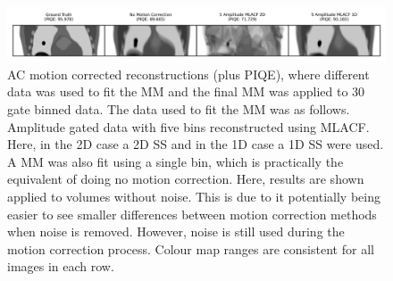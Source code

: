             \begin{figure}
                \centering
                
                \includegraphics[width=1.0\linewidth]{figures/motion_correction_2_results_2_noiseless_1d_vs_2d_visual_analysis.png}
                
                \captionsetup{singlelinecheck=false}
                \caption{
                    \gls{AC} motion corrected reconstructions (plus \gls{PIQE}), where different data was used to fit the \gls{MM} and the final \gls{MM} was applied to $30$ gate binned data. The data used to fit the \gls{MM} was as follows. Amplitude gated data with five bins reconstructed using \gls{MLACF}. Here, in the \gls{2D} case a \gls{2D} \gls{SS} and in the \gls{1D} case a \gls{1D} \gls{SS} were used. A \gls{MM} was also fit using a single bin, which is practically the equivalent of doing no motion correction. Here, results are shown applied to volumes without noise. This is due to it potentially being easier to see smaller differences between motion correction methods when noise is removed. However, noise is still used during the motion correction process. Colour map ranges are consistent for all images in each row.
                }
                
                \label{fig:evaluation_of_pet_ct_motion_correction_incorporating_motion_models_using_mlacf_and_complex_gating_schemes_results_noiseless_1d_vs_2d_visual_analysis}
            \end{figure}

